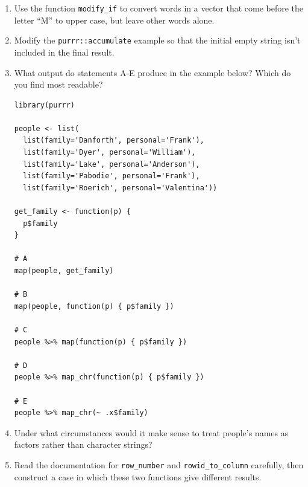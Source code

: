 \begin{enumerate}

\item
  Use the function \texttt{modify\_if} to convert words in a vector that come before the letter ``M'' to upper case,
  but leave other words alone.

\item
  Modify the \texttt{purrr::accumulate} example so that the initial empty string isn't included in the final result.

\item
  What output do statements A-E produce in the example below?
  Which do you find most readable?

\begin{lstlisting}
library(purrr)

people <- list(
  list(family='Danforth', personal='Frank'),
  list(family='Dyer', personal='William'),
  list(family='Lake', personal='Anderson'),
  list(family='Pabodie', personal='Frank'),
  list(family='Roerich', personal='Valentina'))

get_family <- function(p) {
  p$family
}

# A
map(people, get_family)

# B
map(people, function(p) { p$family })

# C
people %>% map(function(p) { p$family })

# D
people %>% map_chr(function(p) { p$family })

# E
people %>% map_chr(~ .x$family)
\end{lstlisting}

\item
  Under what circumstances would it make sense
  to treat people's names as factors rather than character strings?

\item
  Read the documentation for \texttt{row\_number} and \texttt{rowid\_to\_column} carefully,
  then construct a case in which these two functions give different results.

\end{enumerate}
